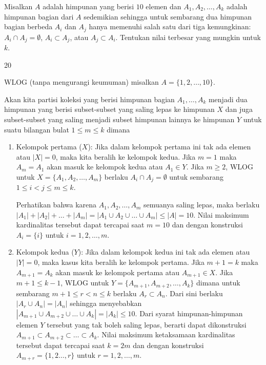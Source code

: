 \documentclass[11pt]{scrartcl}
\begin{document}
	\begin{soalbaru}
		Misalkan $A$ adalah himpunan yang berisi $10$ elemen dan $A_1,A_2,\dots,A_k$ adalah himpunan bagian dari $A$ sedemikian sehingga untuk sembarang dua himpunan bagian berbeda $A_i$ dan $A_j$ hanya memenuhi salah satu dari tiga kemungkinan: $A_i \cap A_j = \emptyset$, $A_i \subset A_j$, atau $A_j \subset A_i$. Tentukan nilai terbesar yang mungkin untuk $k$.\\[-20pt] %
		
		\begin{jawaban}
		20
		\end{jawaban}
		\begin{solusi}
		WLOG (tanpa mengurangi keumuman) misalkan $A=\{1,2,\dots,10\}$.
		
		Akan kita partisi koleksi yang berisi himpunan bagian  $A_1,\dots,A_k$ menjadi dua himpunan yang berisi subset-subset yang saling lepas ke himpunan $X$ dan juga subset-subset yang saling menjadi subset himpunan lainnya ke himpunan $Y$ untuk suatu bilangan bulat $1\le m \le k$ dimana
		
		\begin{enumerate}
		\item 	Kelompok pertama ($X$):
		Jika dalam kelompok pertama ini tak ada elemen atau $|X|=0$, maka kita beralih ke kelompok kedua. Jika $m = 1$ maka $A_m = A_1$ akan masuk ke kelompok kedua atau $A_1 \in Y$. 
		 Jika $m \ge 2$, WLOG untuk $X=\{A_1,A_2,\dots,A_m\}$ berlaku $A_i \cap A_j = \emptyset$ untuk sembarang $1 \le i < j \le m \le k$. 
		 
		 Perhatikan bahwa karena $A_1,A_2,\dots,A_m$ semuanya saling lepas, maka berlaku\\ $ |A_1|+|A_2|+\dots+|A_m| = |A_1 \cup A_2 \cup \dots \cup A_m| \le |A| = 10$. 
		 Nilai maksimum kardinalitas tersebut dapat tercapai saat $m=10$ dan dengan konstruksi $A_i = \{i\}$ untuk $i=1,2,\dots,m$.
				
		\item Kelompok kedua ($Y$):
		Jika dalam kelompok kedua ini tak ada elemen atau $|Y|=0$, maka kasus kita beralih ke kelompok pertama. Jika $m+1 = k$ maka $A_{m+1} = A_k$ akan masuk ke kelompok pertama atau $A_{m+1} \in X$.
		Jika $m+1 \le k-1$, WLOG untuk $Y=\{A_{m+1},A_{m+2},\dots,A_{k}\}$ dimana untuk sembarang $m+1 \le r < n \le k$ berlaku $A_{r} \subset A_{n}$. Dari sini berlaku $|A_{r} \cup A_n| = |A_n|$ sehingga menyebabkan $|A_{m+1}\cup A_{m+2}\cup\dots\cup A_{k}|=|A_{k}| \le 10$. Dari syarat himpunan-himpunan elemen $Y$ tersebut yang tak boleh saling lepas, berarti dapat dikonstruksi $A_{m+1} \subset A_{m+2} \subset \dots \subset A_k$. Nilai maksimum ketaksamaan kardinalitas tersebut dapat tercapai saat $k=2m$ dan dengan konstruksi $A_{m+r} = \{1,2\dots,r\}$ untuk $r=1,2,\dots,m$.
		\end{enumerate}
		

\end{solusi}
\end{soalbaru}
\end{document}
